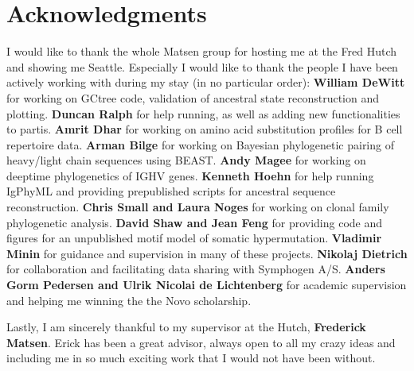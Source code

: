% 

\cleardoublepage

\section*{Acknowledgments}
I would like to thank the whole Matsen group for hosting me at the Fred Hutch and showing me Seattle.
Especially I would like to thank the people I have been actively working with during my stay (in no particular order):
\textbf{William DeWitt} for working on GCtree code, validation of ancestral state reconstruction and plotting.
\textbf{Duncan Ralph} for help running, as well as adding new functionalities to partis.
\textbf{Amrit Dhar} for working on amino acid substitution profiles for B cell repertoire data.
\textbf{Arman Bilge} for working on Bayesian phylogenetic pairing of heavy/light chain sequences using BEAST.
\textbf{Andy Magee} for working on deeptime phylogenetics of IGHV genes.
\textbf{Kenneth Hoehn} for help running IgPhyML and providing prepublished scripts for ancestral sequence reconstruction.
\textbf{Chris Small and Laura Noges} for working on clonal family phylogenetic analysis.
\textbf{David Shaw and Jean Feng} for providing code and figures for an unpublished motif model of somatic hypermutation.
\textbf{Vladimir Minin} for guidance and supervision in many of these projects.
\textbf{Nikolaj Dietrich} for collaboration and facilitating data sharing with Symphogen A/S.
\textbf{Anders Gorm Pedersen and Ulrik Nicolai de Lichtenberg} for academic supervision and helping me winning the the Novo scholarship.

Lastly, I am sincerely thankful to my supervisor at the Hutch, \textbf{Frederick Matsen}.
Erick has been a great advisor, always open to all my crazy ideas and including me in so much exciting work that I would not have been without.


